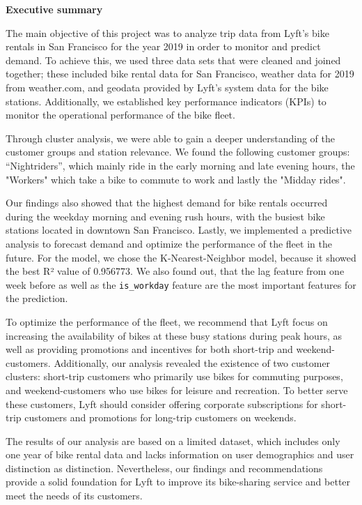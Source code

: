 \hypertarget{abstract}{}

\thispagestyle{plain}

\begin{center}
    \textbf{Executive summary}
\end{center}

The main objective of this project was to analyze trip data from Lyft's bike rentals in San Francisco for the year 2019 in order to monitor and predict demand. To achieve this, we used three data sets that were cleaned and joined together; these included bike rental data for San Francisco, weather data for 2019 from weather.com, and geodata provided by Lyft's system data for the bike stations. Additionally, we established key performance indicators (KPIs) to monitor the operational performance of the bike fleet.

Through cluster analysis, we were able to gain a deeper understanding of the customer groups and station relevance. We found the following customer groups: \enquote{Nightriders}, which mainly ride in the early morning and late evening hours,  the "Workers" which take a bike to commute to work and lastly the "Midday rides". 

Our findings also showed that the highest demand for bike rentals occurred during the weekday morning and evening rush hours, with the busiest bike stations located in downtown San Francisco. 
Lastly, we implemented a predictive analysis to forecast demand and optimize the performance of the fleet in the future. For the model, we chose the K-Nearest-Neighbor model, because it showed the best R² value of 0.956773. We also found out, that the lag feature from one week before as well as the \texttt{is\_workday} feature are the most important features for the prediction.

To optimize the performance of the fleet, we recommend that Lyft focus on increasing the availability of bikes at these busy stations during peak hours, as well as providing promotions and incentives for both short-trip and weekend-customers. Additionally, our analysis revealed the existence of two customer clusters: short-trip customers who primarily use bikes for commuting purposes, and weekend-customers who use bikes for leisure and recreation. To better serve these customers, Lyft should consider offering corporate subscriptions for short-trip customers and promotions for long-trip customers on weekends.

The results of our analysis are based on a limited dataset, which includes only one year of bike rental data and lacks information on user demographics and user distinction as distinction. Nevertheless, our findings and recommendations provide a solid foundation for Lyft to improve its bike-sharing service and better meet the needs of its customers.
